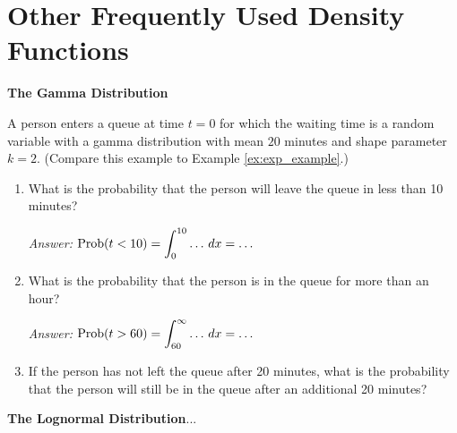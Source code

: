 \section{Other Frequently Used Density Functions}
%
\noindent
\textbf{The Gamma Distribution}
\begin{xexample}
A person enters a queue at time $t=0$ for which the
waiting time is a random variable with a gamma distribution
with mean $20$ minutes and shape parameter $k=2$.
(Compare this example to Example \ref{ex:exp_example}.)
\begin{enumerate}
\item What is the probability that the person will leave the
queue in less than 10 minutes?

\noindent
\emph{Answer:} $\displaystyle \textrm{Prob}(t < 10) = \int_0^{10} \ldots \,dx
     = \ldots$
\item What is the probability that the person is in the queue for
more than an hour?

\noindent
\emph{Answer:}
 $\displaystyle \textrm{Prob}(t > 60) = \int_{60}^{\infty} \ldots \,dx
     = \ldots$

\item If the person has not left the queue after 20 minutes, what is the
probability that the person will still be in the queue after an additional
20 minutes?
\end{enumerate}
\end{xexample}

\noindent
\textbf{The Lognormal Distribution}...
